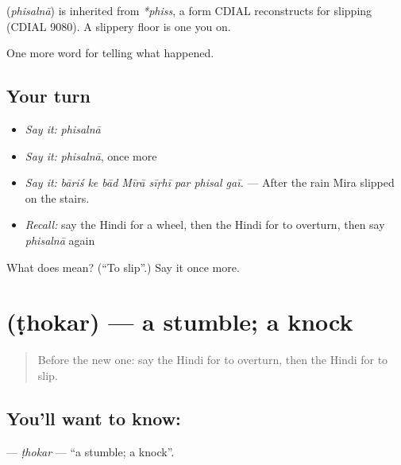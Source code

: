 \begin{cousinweb}
\textbf{} (\emph{phisalnā}) is inherited from \emph{*phiss}, a form CDIAL reconstructs for slipping (CDIAL 9080). A slippery floor is one you \textbf{ } on.
\end{cousinweb}

\begin{grammarlens}[title={What you've built}]
One more word for telling what happened.
\end{grammarlens}

\subsection*{Your turn}
\begin{itemize}
\raggedright
  \item \emph{Say it:} \emph{phisalnā}
  \item \emph{Say it:} \emph{phisalnā}, once more
  \item \emph{Say it:} \emph{bāriś ke bād Mīrā sīṛhī par phisal gaī.} — After the rain Mira slipped on the stairs.
  \item \emph{Recall:} say the Hindi for a wheel, then the Hindi for to overturn, then say \emph{phisalnā} again
\end{itemize}

\begin{tcolorbox}[breakable,colback=teal!4,colframe=teal!35!black,title={Before you move on}]
What does  mean? (\textquotedblleft{}To slip\textquotedblright{}.) Say it once more.
\end{tcolorbox}
\section[\texorpdfstring{\hi{ठोकर} (ṭhokar)}{ठोकर (ṭhokar)}]{ (ṭhokar) — a stumble; a knock}

\label{lesson:HI-C297-thokar}



\begin{quote}
Before the new one: say the Hindi for to overturn, then the Hindi for to slip.
\end{quote}

\subsection*{You'll want to know: }
\textbf{} — \emph{ṭhokar} — \textquotedblleft{}a stumble; a knock\textquotedblright{}.

